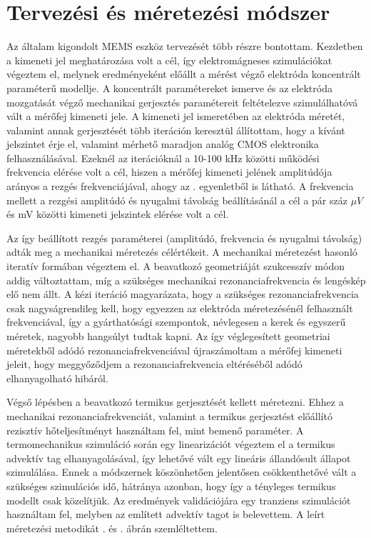 \section{Tervezési és méretezési módszer}

Az általam kigondolt MEMS eszköz tervezését több részre bontottam. Kezdetben a kimeneti jel meghatározása volt a cél, így elektromágneses szimulációkat végeztem el, melynek eredményeként előállt a mérést végző elektróda koncentrált paraméterű modellje. A koncentrált paramétereket ismerve és az elektróda mozgatását végző mechanikai gerjesztés paramétereit feltételezve szimulálhatóvá vált a mérőfej kimeneti jele. A kimeneti jel ismeretében az elektróda méretét, valamint annak gerjesztését több iteráción keresztül állítottam, hogy a kívánt jelszintet érje el, valamint mérhető maradjon analóg CMOS elektronika felhasználásával. Ezeknél az iterációknál a 10-100 kHz közötti működési frekvencia elérése volt a cél, hiszen a mérőfej kimeneti jelének amplitúdója arányos a rezgés frekvenciájával, ahogy az . egyenletből is látható. A frekvencia mellett a rezgési amplitúdó és nyugalmi távolság beállításánál a cél a pár száz $\mu V$ és mV közötti kimeneti jelszintek elérése volt a cél.

Az így beállított rezgés paraméterei (amplitúdó, frekvencia és nyugalmi távolság) adták meg a mechanikai méretezés célértékeit. A mechanikai méretezést hasonló iteratív formában végeztem el. A beavatkozó geometriáját szukcesszív módon addig változtattam, míg a szükséges mechanikai rezonanciafrekvencia és lengéskép elő nem állt. A kézi iteráció magyarázata, hogy a szükséges rezonanciafrekvencia csak nagyságrendileg kell, hogy egyezzen az elektróda méretezésénél felhasznált frekvenciával, így a gyárthatósági szempontok, névlegesen a kerek és egyszerű méretek, nagyobb hangsúlyt tudtak kapni. Az így véglegesített geometriai méretekből adódó rezonanciafrekvenciával újraszámoltam a mérőfej kimeneti jeleit, hogy meggyőződjem a rezonanciafrekvencia eltéréséből adódó elhanyagolható hibáról.

Végső lépésben a beavatkozó termikus gerjesztését kellett méretezni. Ehhez a mechanikai rezonanciafrekvenciát, valamint a termikus gerjesztést előállító rezisztív hőteljesítményt használtam fel, mint bemenő paraméter. A termomechanikus szimuláció során egy linearizációt végeztem el a termikus advektív tag elhanyagolásával, így lehetővé vált egy lineáris állandósult állapot szimulálása. Ennek a módszernek köszönhetően jelentősen csökkenthetővé vált a szükséges szimulációs idő, hátránya azonban, hogy így a tényleges termikus modellt csak közelítjük. Az eredmények validációjára egy tranziens szimulációt használtam fel, melyben az említett advektív tagot is belevettem. A leírt méretezési metodikát . és . ábrán szemléltettem.

